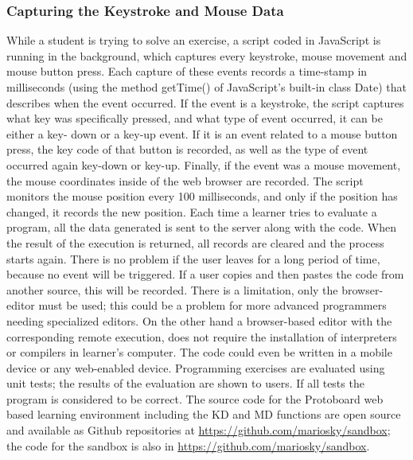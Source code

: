 \documentclass[a4paper,twoside]{article}
\begin{document}
\subsubsection{Capturing the Keystroke and Mouse Data} 
While a student is trying
to solve an exercise, a script coded in JavaScript is running in the background,
which captures every keystroke, mouse movement and mouse button press. Each
capture of these events records a time-stamp in milliseconds (using the method
getTime() of JavaScript's built-in class Date) that describes when the event
occurred. If the event is a keystroke, the script captures what key was
specifically pressed, and what type of event occurred, it can be either a key-
down or a key-up event. If it is an event related to a mouse button press, the
key code of that button is recorded, as well as the type of event occurred again
key-down or key-up. Finally, if the event was a mouse movement, the mouse
coordinates inside of the web browser are recorded. The script monitors the
mouse position every 100 milliseconds, and only if the position has changed, it
records the new position. Each time a learner tries to evaluate a program, all
the data generated is sent to the server along with the code. When the result of
the execution is returned, all records are cleared and the process starts again.
There is no problem if the user leaves for a long period of time, because no
event will be triggered. If a user copies and then pastes the code from another
source, this will be recorded. There is a limitation, only the browser-editor
must be used; this could be a problem for more advanced programmers needing
specialized editors.  On the other hand a browser-based editor with the
corresponding remote execution, does not require the installation of
interpreters or compilers in learner’s computer. The code could even be written
in a mobile device or any web-enabled device. Programming exercises are evaluated using unit
tests; the results of the evaluation are shown to users. If all tests the
program is considered to be correct. The source code for the Protoboard web
based learning environment including the KD and MD functions are open source and
available as Github repositories at \url{https://github.com/mariosky/sandbox}; the code for the
sandbox is also in \url{https://github.com/mariosky/sandbox}.
\end{document}
